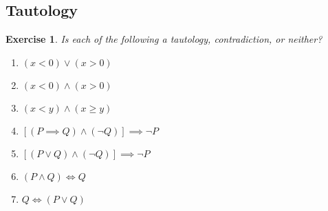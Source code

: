 \documentclass{article}[12pt]
\newtheorem{exercise}{Exercise}[section]
\begin{document}
    
    \subsection{Tautology}
    
        \begin{exercise}
            Is each of the following a tautology, contradiction, or neither?
            \begin{multicols}{2}
                \begin{enumerate}
                    \item
                    $(x < 0) \lor (x > 0)$
                    
                    \item
                    $(x < 0) \land (x > 0)$
                    
                    \item
                    $(x < y) \land (x \ge y)$
                    
                    \item
                    $[(P \implies Q) \land (\neg Q)] \implies  \neg P$
                    
                    \item
                    $[(P \lor Q) \land (\neg Q)] \implies  \neg P$
                    
                    \item
                    $(P \land Q) \iff Q$
                    
                    \item
                    $Q \iff (P \lor Q)$
                    
                \end{enumerate}
            \end{multicols}
            
        \end{exercise}
        
\end{document}
